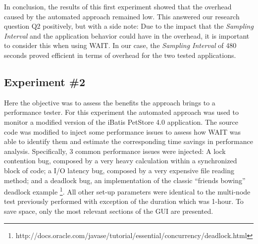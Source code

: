 \documentclass[runningheads,a4paper]{llncs}
\begin{document}

In conclusion, the results of this first experiment showed that the overhead
caused by the automated approach remained low. This answered our research
question Q2 positively, but with a side note: Due to the impact that the
\emph{Sampling Interval} and the application behavior could have in the
overhead, it is important to consider this when using WAIT. In our case, the
\emph{Sampling Interval} of 480 seconds proved efficient in terms of overhead for the two tested applications.

\vspace{-5pt}
\subsection{Experiment \#2}
\vspace{-5pt}
Here the objective was to assess the benefits the approach brings to a
performance tester. For this experiment the automated approach was used to
monitor a modified version of the iBatis PetStore 4.0 application. The source
code was modified to inject some performance issues to assess how WAIT was able
to identify them and estimate the corresponding time savings in performance
analysis. Specifically, 3 common performance issues were injected: A lock
contention bug, composed by a very heavy calculation within a synchronized block
of code; a I/O latency bug, composed by a very expensive file reading method;
and a deadlock bug, an implementation of the classic ``friends bowing'' deadlock example
\footnote{http://docs.oracle.com/javase/tutorial/essential/concurrency/deadlock.html}.
All other set-up parameters were identical to the multi-node test
previously performed with exception of the duration which was 1-hour. To save
space, only the most relevant sections of the GUI are presented.
\end{document}
